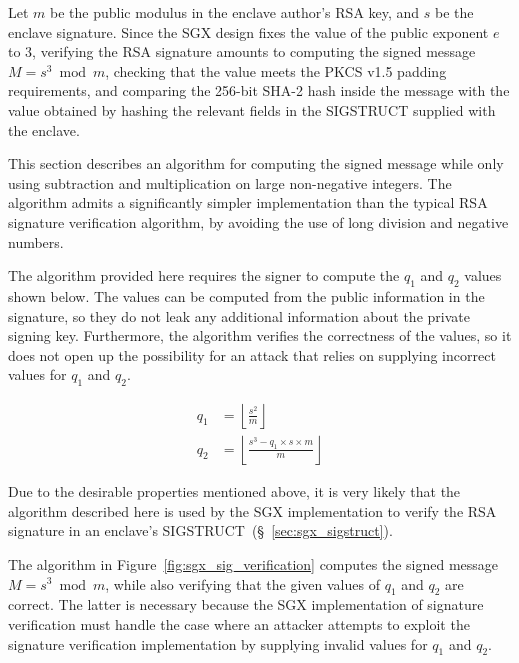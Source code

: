 \label{sec:sgx_rsa_check}

Let $m$ be the public modulus in the enclave author's RSA key, and $s$ be the
enclave signature. Since the SGX design fixes the value of the public exponent
$e$ to $3$, verifying the RSA signature amounts to computing the signed
message $M = s^3 \bmod m$, checking that the value meets the PKCS v1.5 padding
requirements, and comparing the 256-bit SHA-2 hash inside the message with the
value obtained by hashing the relevant fields in the SIGSTRUCT supplied with
the enclave.

This section describes an algorithm for computing the signed message while only
using subtraction and multiplication on large non-negative integers. The
algorithm admits a significantly simpler implementation than the typical RSA
signature verification algorithm, by avoiding the use of long division and
negative numbers.

The algorithm provided here requires the signer to compute the $q_1$ and
$q_2$ values shown below. The values can be computed from the public
information in the signature, so they do not leak any additional information
about the private signing key. Furthermore, the algorithm verifies the
correctness of the values, so it does not open up the possibility for an attack
that relies on supplying incorrect values for $q_1$ and $q_2$.

\begin{align*}
q_1 & = \left\lfloor \frac{s^2}{m} \right\rfloor \\
q_2 & = \left\lfloor \frac{s^3 - q_1 \times s \times m}{m} \right\rfloor
\end{align*}

Due to the desirable properties mentioned above, it is very likely that the
algorithm described here is used by the SGX implementation to verify the RSA
signature in an enclave's SIGSTRUCT~(\S~\ref{sec:sgx_sigstruct}).

The algorithm in Figure~\ref{fig:sgx_sig_verification} computes the signed
message $M = s^3 \bmod m$, while also verifying that the given values of $q_1$
and $q_2$ are correct. The latter is necessary because the SGX implementation
of signature verification must handle the case where an attacker attempts to
exploit the signature verification implementation by supplying invalid values
for $q_1$ and $q_2$.

